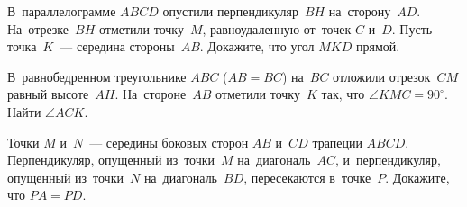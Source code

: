 


\begin{problems}

\item
В~параллелограмме $ABCD$ опустили перпендикуляр~$BH$ на~сторону~$AD$.
На~отрезке~$BH$ отметили точку~$M$, равноудаленную от~точек $C$ и~$D$.
Пусть точка~$K$~--- середина стороны~$AB$.
Докажите, что угол $MKD$ прямой.

\item
В~равнобедренном треугольнике $ABC$ ($AB = BC$) на~$BC$ отложили отрезок~$CM$
равный высоте~$AH$.
На~стороне~$AB$ отметили точку~$K$ так, что $\angle KMC = 90^{\circ}$.
Найти $\angle ACK$.

\item
Точки $M$ и~$N$~--- середины боковых сторон $AB$ и~$CD$ трапеции $ABCD$.
Перпендикуляр, опущенный из~точки~$M$ на~диагональ~$AC$, и~перпендикуляр,
опущенный из~точки~$N$ на~диагональ~$BD$, пересекаются в~точке~$P$.
Докажите, что $PA = PD$.

\end{problems}

